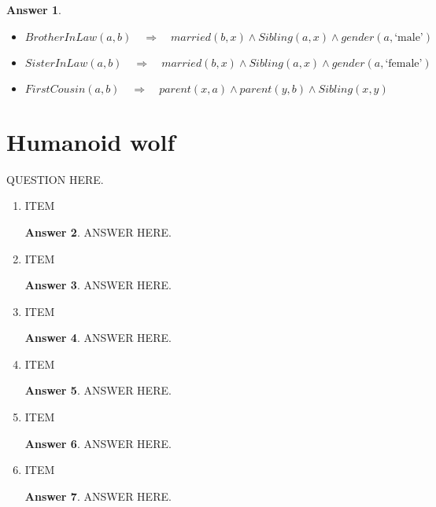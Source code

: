 \documentclass[a4paper]{article}
\renewcommand{\(}{\left(}
\renewcommand{\)}{\right)}
\theoremstyle{plain}
\theoremstyle{plain}
\theoremstyle{definition}
\newtheorem*{answer}{Answer}
\begin{document}
\begin{shaded}
\begin{answer}
\begin{itemize}
\begin{itemize}
      \end{itemize}
  \item $ BrotherInLaw(a,b) \quad \Rightarrow \quad married(b,x) \wedge Sibling(a,x) \wedge gender(a,\text{`male'}) $
  \item $ SisterInLaw(a,b) \quad \Rightarrow \quad married(b,x) \wedge Sibling(a,x) \wedge gender(a,\text{`female'}) $
  \item $ FirstCousin(a,b) \quad \Rightarrow \quad parent(x,a) \wedge parent(y,b) \wedge Sibling(x,y) $
\end{itemize}
\end{answer}
\end{shaded}

\section{Humanoid wolf}
QUESTION HERE.
\begin{enumerate}[label*=\roman*.,ref=\roman*]

\item ITEM
\begin{shaded}
\begin{answer}
ANSWER HERE.
\end{answer}
\end{shaded}

\item ITEM
\begin{shaded}
\begin{answer}
ANSWER HERE.
\end{answer}
\end{shaded}

\item ITEM
\begin{shaded}
\begin{answer}
ANSWER HERE.
\end{answer}
\end{shaded}

\item ITEM
\begin{shaded}
\begin{answer}
ANSWER HERE.
\end{answer}
\end{shaded}

\item ITEM
\begin{shaded}
\begin{answer}
ANSWER HERE.
\end{answer}
\end{shaded}

\item ITEM
\begin{shaded}
\begin{answer}
ANSWER HERE.
\end{answer}
\end{shaded}

\end{enumerate}
\end{document}
